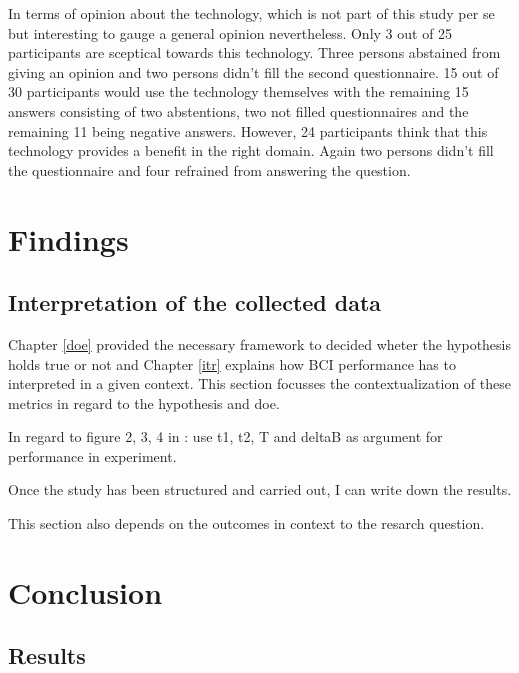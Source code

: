             In terms of opinion about the technology, which is not part of this study per se but interesting to gauge a general opinion nevertheless. Only 3 out of 25 participants are sceptical towards this technology. Three persons abstained from giving an opinion and two persons didn't fill the second questionnaire. 15 out of 30 participants would use the technology themselves with the remaining 15 answers consisting of two abstentions, two not filled questionnaires and the remaining 11 being negative answers. However, 24 participants think that this technology provides a benefit in the right domain. Again two persons didn't fill the questionnaire and four refrained from answering the question.

    \chapter{Findings}

        \section{Interpretation of the collected data}\label{operationalization}

            Chapter \ref*{doe} provided the necessary framework to decided wheter the hypothesis holds true or not and Chapter \ref*{itr} explains how BCI performance has to interpreted in a given context. This section focusses the contextualization of these metrics in regard to the hypothesis and doe.

            \medskip

            

            In regard to figure 2, 3, 4 in \cite{Yuan.2013}: use t1, t2, T and deltaB as argument for performance in experiment.    

                Once the study has been structured and carried out, I can write down the results.

                This section also depends on the outcomes in context to the resarch question.

    \chapter{Conclusion}

        \section{Results}

